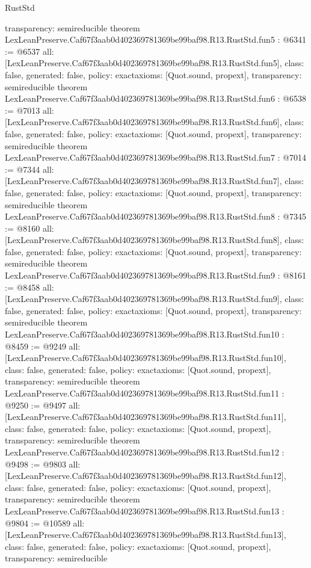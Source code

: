 \begin{lexlean}{RustStd}
\begin{coremodule}
{  transparency: semireducible
}
theorem LexLeanPreserve.Caf67f3aab0d402369781369be99baf98.R13.RustStd.fun5 : @6341 := @6537 {
  all: [LexLeanPreserve.Caf67f3aab0d402369781369be99baf98.R13.RustStd.fun5],
  class: false,
  generated: false,
  policy: exact{axioms: [Quot.sound, propext]},
  transparency: semireducible
}
theorem LexLeanPreserve.Caf67f3aab0d402369781369be99baf98.R13.RustStd.fun6 : @6538 := @7013 {
  all: [LexLeanPreserve.Caf67f3aab0d402369781369be99baf98.R13.RustStd.fun6],
  class: false,
  generated: false,
  policy: exact{axioms: [Quot.sound, propext]},
  transparency: semireducible
}
theorem LexLeanPreserve.Caf67f3aab0d402369781369be99baf98.R13.RustStd.fun7 : @7014 := @7344 {
  all: [LexLeanPreserve.Caf67f3aab0d402369781369be99baf98.R13.RustStd.fun7],
  class: false,
  generated: false,
  policy: exact{axioms: [Quot.sound, propext]},
  transparency: semireducible
}
theorem LexLeanPreserve.Caf67f3aab0d402369781369be99baf98.R13.RustStd.fun8 : @7345 := @8160 {
  all: [LexLeanPreserve.Caf67f3aab0d402369781369be99baf98.R13.RustStd.fun8],
  class: false,
  generated: false,
  policy: exact{axioms: [Quot.sound, propext]},
  transparency: semireducible
}
theorem LexLeanPreserve.Caf67f3aab0d402369781369be99baf98.R13.RustStd.fun9 : @8161 := @8458 {
  all: [LexLeanPreserve.Caf67f3aab0d402369781369be99baf98.R13.RustStd.fun9],
  class: false,
  generated: false,
  policy: exact{axioms: [Quot.sound, propext]},
  transparency: semireducible
}
theorem LexLeanPreserve.Caf67f3aab0d402369781369be99baf98.R13.RustStd.fun10 : @8459 := @9249 {
  all: [LexLeanPreserve.Caf67f3aab0d402369781369be99baf98.R13.RustStd.fun10],
  class: false,
  generated: false,
  policy: exact{axioms: [Quot.sound, propext]},
  transparency: semireducible
}
theorem LexLeanPreserve.Caf67f3aab0d402369781369be99baf98.R13.RustStd.fun11 : @9250 := @9497 {
  all: [LexLeanPreserve.Caf67f3aab0d402369781369be99baf98.R13.RustStd.fun11],
  class: false,
  generated: false,
  policy: exact{axioms: [Quot.sound, propext]},
  transparency: semireducible
}
theorem LexLeanPreserve.Caf67f3aab0d402369781369be99baf98.R13.RustStd.fun12 : @9498 := @9803 {
  all: [LexLeanPreserve.Caf67f3aab0d402369781369be99baf98.R13.RustStd.fun12],
  class: false,
  generated: false,
  policy: exact{axioms: [Quot.sound, propext]},
  transparency: semireducible
}
theorem LexLeanPreserve.Caf67f3aab0d402369781369be99baf98.R13.RustStd.fun13 : @9804 := @10589 {
  all: [LexLeanPreserve.Caf67f3aab0d402369781369be99baf98.R13.RustStd.fun13],
  class: false,
  generated: false,
  policy: exact{axioms: [Quot.sound, propext]},
  transparency: semireducible
}
\end{coremodule}
\end{lexlean}
